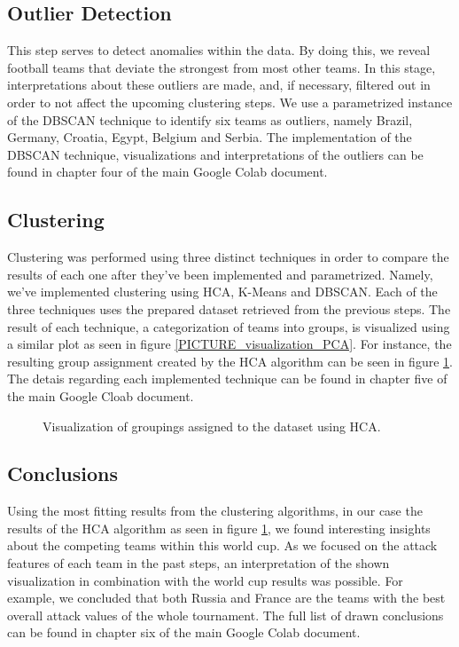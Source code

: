 \subsection{Outlier Detection}
This step serves to detect anomalies within the data. By doing this, we reveal football teams that deviate the strongest from most other teams. In this stage, interpretations about these outliers are made, and, if necessary, filtered out in order to not affect the upcoming clustering steps. We use a parametrized instance of the DBSCAN technique to identify six teams as outliers, namely Brazil, Germany, Croatia, Egypt, Belgium and Serbia. The implementation of the DBSCAN technique, visualizations and interpretations of the outliers can be found in chapter four of the main Google Colab document.

\newpage

\subsection{Clustering}
Clustering was performed using three distinct techniques in order to compare the results of each one after they've been implemented and parametrized. Namely, we've implemented clustering using HCA, K-Means and DBSCAN. Each of the three techniques uses the prepared dataset retrieved from the previous steps. The result of each technique, a categorization of teams into groups, is visualized using a similar plot as seen in figure \ref{PICTURE_visualization_PCA}. For instance, the resulting group assignment created by the HCA algorithm can be seen in figure \ref{PICTURE_visualization_HCA}. The detais regarding each implemented technique can be found in chapter five of the main Google Cloab document.

\begin{figure}[h!]
	\centering
	\caption{Visualization of groupings assigned to the dataset using HCA.}
	\label{PICTURE_visualization_HCA}
\end{figure}

\subsection{Conclusions}
Using the most fitting results from the clustering algorithms, in our case the results of the HCA algorithm as seen in figure \ref{PICTURE_visualization_HCA}, we found interesting insights about the competing teams within this world cup. As we focused on the attack features of each team in the past steps, an interpretation of the shown visualization in combination with the world cup results was possible. For example, we concluded that both Russia and France are the teams with the best overall attack values of the whole tournament. The full list of drawn conclusions can be found in chapter six of the main Google Colab document. 